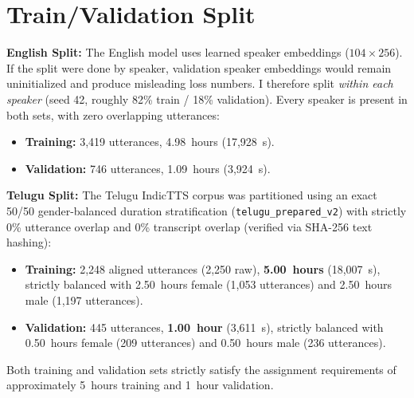 \documentclass[11pt,a4paper]{report}
\begin{document}
\section{Train/Validation Split}\label{sec:splits}
\textbf{English Split:} The English model uses learned speaker embeddings ($104 \times 256$). If the split were done by speaker, validation speaker embeddings would remain uninitialized and produce misleading loss numbers. I therefore split \emph{within each speaker} (seed 42, roughly 82\% train / 18\% validation). Every speaker is present in both sets, with zero overlapping utterances:
\begin{itemize}
    \item \textbf{Training:} 3{,}419 utterances, 4.98~hours (17{,}928~s).
    \item \textbf{Validation:} 746 utterances, 1.09~hours (3{,}924~s).
\end{itemize}

\textbf{Telugu Split:} The Telugu IndicTTS corpus was partitioned using an exact 50/50 gender-balanced duration stratification (\texttt{telugu\_prepared\_v2}) with strictly 0\% utterance overlap and 0\% transcript overlap (verified via SHA-256 text hashing):
\begin{itemize}
    \item \textbf{Training:} 2{,}248 aligned utterances (2{,}250 raw), \textbf{5.00~hours} (18{,}007~s), strictly balanced with 2.50~hours female (1{,}053 utterances) and 2.50~hours male (1{,}197 utterances).
    \item \textbf{Validation:} 445 utterances, \textbf{1.00~hour} (3{,}611~s), strictly balanced with 0.50~hours female (209 utterances) and 0.50~hours male (236 utterances).
\end{itemize}
Both training and validation sets strictly satisfy the assignment requirements of approximately 5~hours training and 1~hour validation.
\end{document}

